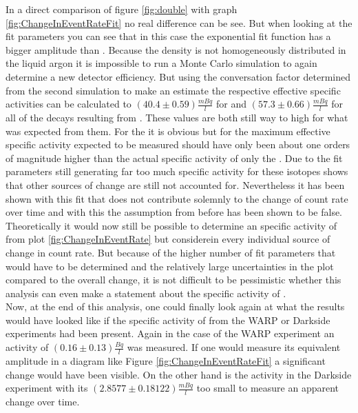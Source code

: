 \documentclass[encoding=utf8,british]{tumphthesis}
\begin{document}
In a direct comparison of figure \ref{fig:double} with graph \ref{fig:ChangeInEventRateFit} no real difference can be see.
But when looking at the fit parameters you can see that in this case the  exponential fit function has a bigger amplitude than \Kr.
Because the  density is not homogeneously distributed in the liquid argon it is impossible to run a Monte Carlo simulation to again determine a new detector efficiency.
But using the conversation factor determined from the second simulation to make an estimate the respective effective specific activities can be calculated to $(40.4\pm0.59)\frac{\unit{mBq}}{\unit{l}}$ for \Kr and $(57.3\pm0.66)\frac{\unit{mBq}}{\unit{l}}$ for all of the decays resulting from .
These values are both still way to high for what was expected from them.
For the \Kr it is obvious but for  the maximum effective specific activity expected to be measured should have only been about one orders of magnitude higher than the actual specific activity of only the .
Due to the fit parameters still generating far too much specific activity for these isotopes shows that other sources of change are still not accounted for.
Nevertheless it has been shown with this fit that \Kr does not contribute solemnly to the change of count rate over time and with this the assumption from before has been shown to be false.
\\

Theoretically it would now still be possible to determine an specific activity of \Kr from plot \ref{fig:ChangeInEventRate} but considerein every individual source of change in count rate.
But because of the higher number of fit parameters that would have to be determined and the relatively large uncertainties in the plot compared to the overall change, it is not difficult to be pessimistic whether this analysis can even make a statement about the specific activity of \Kr.
\\

Now, at the end of this analysis, one could finally look again at what the results would have looked like if the specific activity of \Kr from the WARP or Darkside experiments had been present.
Again in the case of the WARP experiment an activity of $(0.16\pm0.13)\frac{\unit{Bq}}{\unit{l}}$ was measured. 
If one would measure its equivalent amplitude in a diagram like Figure \ref{fig:ChangeInEventRateFit} a significant change would have been visible.
On the other hand is the activity in the Darkside experiment with its $(2.8577 \pm 0.18122) \frac{\unit{mBq}}{\unit{l}}$ too small to measure an apparent change over time.
\\
\end{document}
